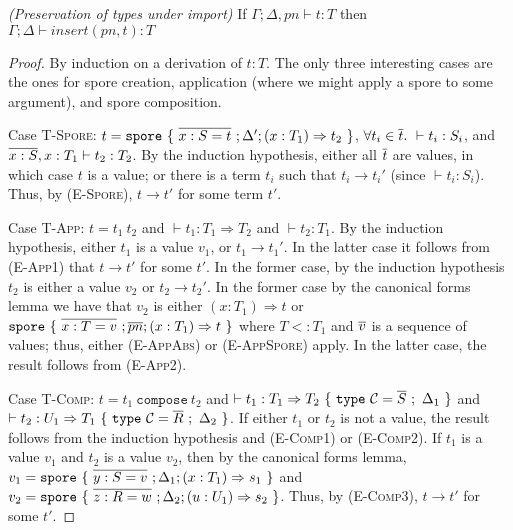 \begin{lemma}
\emph{(Preservation of types under import)}
\label{lem:pres-import}
If $\Gamma ; \Delta, pn \vdash t : T$ then $\Gamma ; \Delta \vdash insert(pn, t) : T$
\end{lemma}
\begin{proof}
By induction on a derivation of $t : T$. The only three interesting cases are the ones for spore creation, application (where we might apply a spore to some argument), and spore composition.

Case \textsc{T-Spore}: $t = \texttt{spore}~\{~\overline{x : S = t}~; \Delta'; (x: T_1) \Rightarrow t_2~\}$, $\forall t_i \in \overline{t}.~\vdash t_i : S_i$, and $\overline{x : S}, x : T_1 \vdash t_2 : T_2$. By the induction hypothesis, either all $\overline{t}$ are values, in which case $t$ is a value; or there is a term $t_i$ such that $t_i \rightarrow t_i'$ (since $\vdash t_i : S_i$). Thus, by (\textsc{E-Spore}), $t \rightarrow t'$ for some term $t'$.

Case \textsc{T-App}: $t = t_1~t_2$ and $\vdash t_1 : T_1 \Rightarrow T_2$ and $\vdash t_2 : T_1$. By the induction hypothesis, either $t_1$ is a value $v_1$, or $t_1 \rightarrow t_1'$. In the latter case it follows from (\textsc{E-App1}) that $t \rightarrow t'$ for some $t'$. In the former case, by the induction hypothesis $t_2$ is either a value $v_2$ or $t_2 \rightarrow t_2'$. In the former case by the canonical forms lemma we have that $v_2$ is either $(x: T_1) \Rightarrow t$ or $\texttt{spore}~\{~\overline{x : T = v}~; \overline{pn} ; (x: T_1) \Rightarrow t~\}$ where $T <: T_1$ and $\overline{v}$ is a sequence of values; thus, either (\textsc{E-AppAbs}) or (\textsc{E-AppSpore}) apply. In the latter case, the result follows from (\textsc{E-App2}).

Case \textsc{T-Comp}: $t = t_1~\texttt{compose}~t_2$ and $\vdash t_1 : T_1 \Rightarrow T_2~\{~\texttt{type}~\mathcal{C} = \overline{S}~;~\Delta_1~\}$ and $\vdash t_2 : U_1 \Rightarrow T_1~\{~\texttt{type}~\mathcal{C} = \overline{R}~;~\Delta_2~\}$. If either $t_1$ or $t_2$ is not a value, the result follows from the induction hypothesis and (\textsc{E-Comp1}) or (\textsc{E-Comp2}). If $t_1$ is a value $v_1$ and $t_2$ is a value $v_2$, then by the canonical forms lemma, $v_1 = \texttt{spore}~\{~\overline{y : S = v}~; \Delta_1; (x: T_1) \Rightarrow s_1~\}$ and $v_2 = \texttt{spore}~\{~\overline{z : R = w}~; \Delta_2; (u: U_1) \Rightarrow s_2~\}$. Thus, by (\textsc{E-Comp3}), $t \rightarrow t'$ for some $t'$.

\end{proof}


